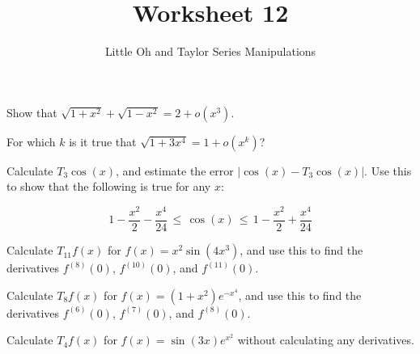 \documentclass[paper=letter, 11pt]{article}
\title{Worksheet 12}
\subtitle{Little Oh and Taylor Series Manipulations}
\begin{document}
\maketitle

\Prob Show that $\sqrt{1 + x^2} + \sqrt{1 - x^2} = 2 + o(x^3)$.\vfill

\Prob For which $k$ is it true that $\sqrt{1 + 3x^4} = 1 + o(x^k)$?\vfill

\Prob Calculate $T_3 \cos(x)$, and estimate the error $\big|\cos(x) - T_3\cos(x)\big|$.  Use this to show that the following is true for any $x$:

\[ 1 - \frac{x^2}{2} - \frac{x^4}{24}\, \leq \,\cos(x)\, \leq\, 1 - \frac{x^2}{2} + \frac{x^4}{24}  \]
\vfill

\newpage

\Prob Calculate $T_{11} f(x)$ for $f(x) = x^2\sin(4x^3)$, and use this to find the derivatives $f^{(8)}(0)$, $f^{(10)}(0)$, and $f^{(11)}(0)$.\vfill


\Prob Calculate $T_{8}f(x)$ for $f(x) = (1 + x^2)e^{-x^4}$, and use this to find the derivatives $f^{(6)}(0)$, $f^{(7)}(0)$, and $f^{(8)}(0)$. \vfill

\Prob Calculate $T_4 f(x)$ for $f(x) = \sin(3x)e^{x^2}$ without calculating any derivatives.\vfill
\end{document}
